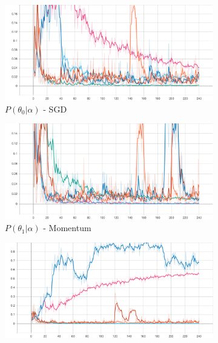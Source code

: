 \begin{figure}[htbp]
    \begin{subfigure}{0.5\textwidth}
        \centering
        \includegraphics[width=\textwidth]{analysis/bhh_case_study/iris/theta[0].png}
        \caption{$P(\theta_{0} | \alpha)$ - \Acs{SGD}}
        \label{fig:results:case_study:iris:p_theta:0}
    \end{subfigure}
    \begin{subfigure}{0.5\textwidth}
        \centering
        \includegraphics[width=\textwidth]{analysis/bhh_case_study/iris/theta[1].png}
        \caption{$P(\theta_{1} | \alpha)$ - \Acs{Momentum}}
        \label{fig:results:case_study:iris:p_theta:1}
    \end{subfigure}
    \par\medskip
    \begin{subfigure}{0.5\textwidth}
        \centering
        \includegraphics[width=\textwidth]{analysis/bhh_case_study/iris/theta[2].png}

\end{subfigure}
\end{figure}
